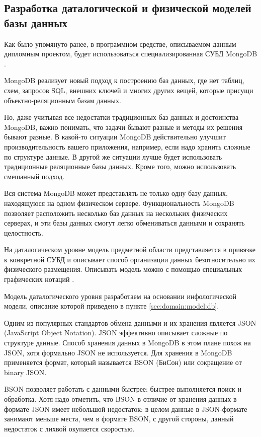 \subsection{Разработка даталогической и физической моделей базы данных}
\label{sec:design:db}

Как было упомянуто ранее, в программном средстве, описываемом данным дипломным проектом, будет использоваться специализированная СУБД MongoDB \cite{mongo}.

MongoDB реализует новый подход к построению баз данных, где нет таблиц, схем, запросов SQL, внешних ключей и многих других вещей, которые присущи объектно-реляционным базам данных.

Но, даже учитывая все недостатки традиционных баз данных и достоинства MongoDB, важно понимать, что задачи бывают разные и методы их решения бывают разные. В какой-то ситуации MongoDB действительно улучшит производительность вашего приложения, например, если надо хранить сложные по структуре данные. В другой же ситуации лучше будет использовать традиционные реляционные базы данных. Кроме того, можно использовать смешанный подход.

Вся система MongoDB может представлять не только одну базу данных, находящуюся на одном физическом сервере. Функциональность \linebreak MongoDB позволяет расположить несколько баз данных на нескольких физических серверах, и эти базы данных смогут легко обмениваться данными и сохранять целостность.

На даталогическом уровне модель предметной области представляется в привязке к конкретной СУБД и описывает способ организации данных безотносительно их физического размещения. Описывать модель можно с помощью специальных графических нотаций \cite{kulikov_db_workbook}. 

Модель даталогического уровня разработаем на основании инфологической модели, описание которой приведено в пункте \ref{sec:domain:model:db}. 

Одним из популярных стандартов обмена данными и их хранения является JSON (JavaScript Object Notation). JSON эффективно описывает сложные по структуре данные. Способ хранения данных в MongoDB в этом плане похож на JSON, хотя формально JSON не используется. Для хранения в MongoDB применяется формат, который называется BSON (БиСон) или сокращение от binary JSON.

BSON позволяет работать с данными быстрее: быстрее выполняется поиск и обработка. Хотя надо отметить, что BSON в отличие от хранения данных в формате JSON имеет небольшой недостаток: в целом данные в JSON-формате занимают меньше места, чем в формате BSON, с другой стороны, данный недостаток с лихвой окупается скоростью.

